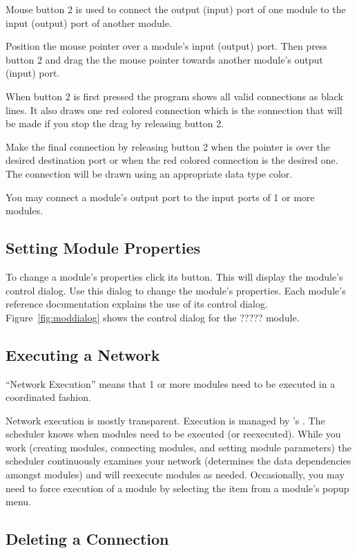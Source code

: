 Mouse button 2 is used to connect the output (input) port of one module to the
input (output) port of another module.  

Position the mouse pointer over a module's input (output) port.  Then press
button 2 and drag the the mouse pointer towards another module's output (input)
port.   

When button 2 is first pressed the program shows all valid connections as
black lines.  It also draws one red colored connection which is the
connection that will be made if you stop the drag by releasing 
button 2.

Make the final connection by releasing button 2 when the pointer is over
the desired destination port or when the red colored connection is the
desired one.  The connection will be drawn using an appropriate data type
color.

You may connect a module's output port to the input ports of 1 or more
modules.

\subsection{Setting Module Properties}
\label{sec:setmodprops}

To change a module's properties click its  button.  This will
display the module's control dialog.  Use this dialog to change the
module's properties.  Each module's reference documentation explains the
use of its control dialog.  Figure~\ref{fig:moddialog} shows the control
dialog for the ????? module.

\subsection{Executing a Network}
\label{sec:executenet}

``Network Execution'' means that 1 or more modules need to be executed in a
coordinated fashion.

Network execution is mostly transparent.  Execution is managed by
\sr{}'s .  The scheduler knows when modules need to be
executed (or reexecuted).  While you work (creating modules, connecting
modules, and setting module parameters) the scheduler continuously examines
your network (determines the data dependencies amongst modules) and will
reexecute modules as needed.  Occasionally, you may need to force execution
of a module by selecting the  item from a module's popup
menu.

\subsection{Deleting a Connection}
\label{sec:deleteconnections}

